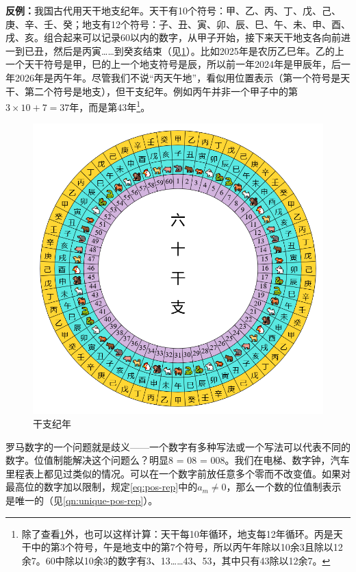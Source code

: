 \documentclass[b5paper]{ctexart}
\begin{document}
\begin{example}
\textbf{反例：}我国古代用天干地支纪年。天干有10个符号：甲、乙、丙、丁、戊、己、庚、辛、壬、癸；地支有12个符号：子、丑、寅、卯、辰、巳、午、未、申、酉、戌、亥。组合起来可以记录60以内的数字，从甲子开始，接下来天干地支各向前进一到已丑，然后是丙寅……到癸亥结束（见\cref{fig:sexagenary}）。比如2025年是农历乙巳年。乙的上一个天干符号是甲，巳的上一个地支符号是辰，所以前一年2024年是甲辰年，后一年2026年是丙午年。尽管我们不说“丙天午地”，看似用位置表示（第一个符号是天干、第二个符号是地支），但干支纪年。例如丙午并非一个甲子中的第$3 \times 10 + 7 = 37$年，而是第43年\footnote{除了查看\cref{fig:sexagenary}外，也可以这样计算：天干每10年循环，地支每12年循环。丙是天干中的第3个符号，午是地支中的第7个符号，所以丙午年除以10余3且除以12余7。60中除以10余3的数字有3、13……43、53，其中只有43除以12余7。}。

\begin{figure}[htbp]
 \centering
 \includegraphics[scale=0.3]{img/sexagenary-chinese}
 \caption{干支纪年}
 \label{fig:sexagenary}
\end{figure}

\end{example}

罗马数字的一个问题就是歧义——一个数字有多种写法或一个写法可以代表不同的数字。位值制能解决这个问题么？明显8 = 08 = 008。我们在电梯、数字钟，汽车里程表上都见过类似的情况。可以在一个数字前放任意多个零而不改变值。如果对最高位的数字加以限制，规定\cref{eq:pos-rep}中的$a_m \neq 0$，那么一个数的位值制表示是唯一的（见\cref{qn:unique-pos-rep}）。
\end{document}

